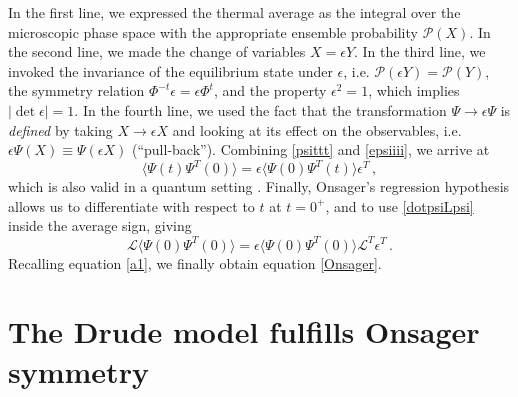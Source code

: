 \documentclass[a4paper, amsfonts, amssymb, amsmath, reprint, showkeys, nofootinbib, twoside,notitlepage,onecolumn]{revtex4-1}
\theoremstyle{definition}
\theoremstyle{theorem}
\begin{document}
In the first line, we expressed the thermal average as the integral over the microscopic phase space with the appropriate ensemble probability $\mathcal{P}(X)$. In the second line, we made the change of variables $X=\epsilon Y$. In the third line, we invoked the invariance of the equilibrium state under $\epsilon$, i.e. $\mathcal{P}(\epsilon Y)=\mathcal{P}(Y)$, the symmetry relation $\Phi^{-t} \epsilon=\epsilon\Phi^{t}$, and the property $\epsilon^2=1$, which implies $|\det \epsilon|= 1$. In the fourth line, we used the fact that the transformation $\Psi \rightarrow \epsilon \Psi$ is \textit{defined} by taking $X\rightarrow \epsilon X$ and looking at its effect on the observables, i.e. $\epsilon \Psi(X)\equiv \Psi(\epsilon X)$ (``pull-back''). Combining \eqref{psittt} and \eqref{epsiiii}, we arrive at
\begin{equation}
\langle \Psi(t) \Psi^T(0)\rangle=  \epsilon\langle \Psi(0) \Psi^T(t)\rangle \epsilon^T \, , 
\end{equation}
which is also valid in a quantum setting \cite{kubo1957statistical}. Finally, Onsager's regression hypothesis allows us to differentiate with respect to $t$ at $t=0^+$, and to use \eqref{dotpsiLpsi} inside the average sign, giving
\begin{equation}
\mathcal{L} \langle \Psi(0) \Psi^T(0)\rangle=  \epsilon\langle \Psi(0) \Psi^T(0)\rangle \mathcal{L}^T \epsilon^T \, .
\end{equation}
Recalling equation \eqref{a1}, we finally obtain equation \eqref{Onsager}.  

\section{The Drude model fulfills Onsager symmetry}\label{drudeonsager}
\end{document}

